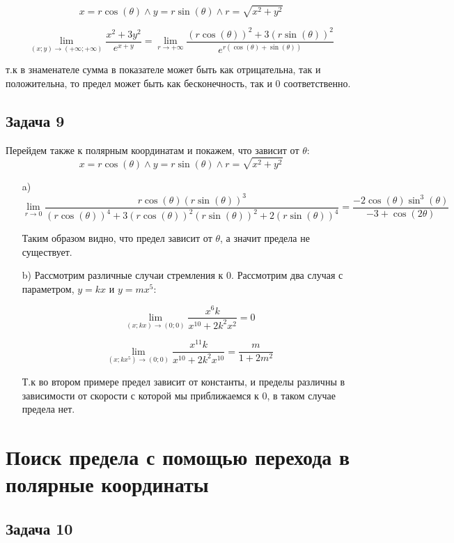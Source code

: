 \documentclass[a4paper,12pt]{article}
\begin{document}
\[
x = r\cos(\theta) \land y = r\sin(\theta) \land r = \sqrt{x^2+y^2}
\]

\[
\lim_{(x;y) \to (+\infty;+\infty)} \frac{x^2+3y^2}{e^{x+y}} = \lim_{r \to +\infty} \frac{(r\cos(\theta))^2+3(r\sin(\theta))^2}{e^{r(\cos(\theta)+\sin(\theta))}}
\]

т.к в знаменателе сумма в показателе может быть как отрицательна, так и положительна, то предел может быть как бесконечность, так и 0 соответственно.

\subsection{Задача 9}

Перейдем также к полярным координатам и покажем, что зависит от $\theta$:
\[
    x = r\cos(\theta) \land y = r\sin(\theta) \land r = \sqrt{x^2+y^2}
\]

\begin{enumerate}
    \item[a)] 
        \[
            \lim_{r \to 0}\frac{r\cos(\theta)(r\sin(\theta))^3}{(r\cos(\theta))^4+3(r\cos(\theta))^2(r\sin(\theta))^2+2(r\sin(\theta))^4} = \frac{-2\cos(\theta)\sin^3(\theta)}{-3+\cos(2\theta)}
        \]
        
        Таким образом видно, что предел зависит от $\theta$, а значит предела не существует.
    
    \item[b)]
        Рассмотрим различные случаи стремления к 0. Рассмотрим два случая с параметром, $y=kx$ и $y=mx^5$:
        
        \[
            \lim_{(x;kx)\to(0;0)} \frac{x^6k}{x^{10}+2k^2x^2} = 0
        \]
        
        \[
            \lim_{(x;kx^5)\to(0;0)} \frac{x^11k}{x^{10}+2k^2x^10} = \frac{m}{1+2m^2}
        \]

        Т.к во втором примере предел зависит от константы, и пределы различны в зависимости от скорости с которой мы приближаемся к 0, в таком случае предела нет.

        


\end{enumerate}

\section{Поиск предела с помощью перехода в полярные координаты}

\subsection{Задача 10}
\end{document}
